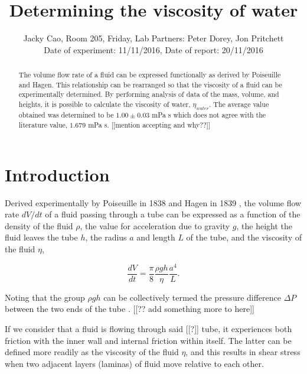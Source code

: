 \documentclass[twocolumn]{revtex4}
\begin{document}
\textheight=26.385cm

\title{Determining the viscosity of water} 
 
 
\author{Jacky Cao, Room 205, Friday, Lab Partners: Peter Dorey, Jon Pritchett \\ Date of experiment: 11/11/2016, Date of report: 20/11/2016}


\begin{abstract}              
 
The volume flow rate of a fluid can be expressed functionally as derived by Poiseuille and Hagen. This relationship can be rearranged so that the viscosity of a fluid can be experimentally determined. By performing analysis of data of the mass, volume, and heights, it is possible to calculate the viscosity of water, $\eta_{water}$. The average value obtained was determined to be $1.00 \pm 0.03$ mPa s which does not agree with the literature value, $1.679$ mPa s. [[mention accepting and why??]]

\end{abstract}

\maketitle

\section{Introduction} 
\vspace{-2ex} 

Derived experimentally by Poiseuille in 1838 and Hagen in 1839 \cite{poiseuillehagen}, the volume flow rate $dV/dt$ of a fluid passing through a tube can be expressed as a function of the density of the fluid $\rho$, the value for acceleration due to gravity $g$, the height the fluid leaves the tube $h$, the radius $a$ and length $L$ of the tube, and the viscosity of the fluid $\eta$,

\begin{equation} 
\frac{dV}{dt}=\frac{\pi}{8}\frac{\rho gh}{\eta}\frac{a^4}{L}. 
\label{pohagen}
\end{equation}

Noting that the group $\rho gh$ can be collectively termed the pressure difference $\Delta P$ between the two ends of the tube \cite{collegephysics}. [[?? add something more to here]]

If we consider that a fluid is flowing through said [[?]] tube, it experiences both friction with the inner wall and internal friction within itself. The latter can be defined more readily as the viscosity of the fluid $\eta$, and this results in shear stress when two adjacent layers (laminas) of fluid move relative to each other. 
\end{document}
